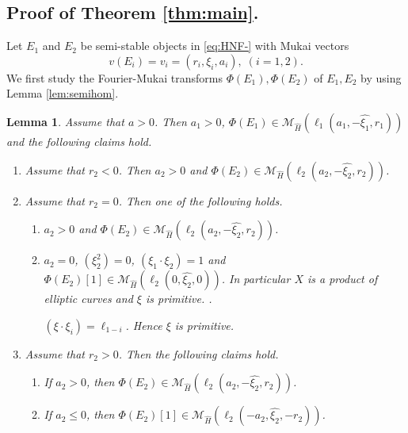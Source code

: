 \documentclass[10pt]{amsart}
\def\cal{\mathcal}
\newenvironment{NB}{
\color{red}{\bf NB}. \footnotesize 
}{}
\numberwithin{equation}{section}
\theoremstyle{plain}
\newtheorem{lem}[thm]{Lemma}
\theoremstyle{definition}
\theoremstyle{remark}
\begin{document}
\subsection{Proof of Theorem \ref{thm:main}.}\label{subsect:proof}

Let $E_1$ and $E_2$ be semi-stable objects in \eqref{eq:HNF-} with Mukai vectors
\begin{equation}
v(E_i)=v_i=(r_i,\xi_i,a_i),\;(i=1,2).
\end{equation}
We first study the Fourier-Mukai transforms $\Phi(E_1),\Phi(E_2)$ of $E_1,E_2$
by using Lemma \ref{lem:semihom}.

\begin{lem}\label{lem:a>0}
Assume that $a >0$.
Then $a_1>0$,
$\Phi(E_1) \in
{\cal M}_{\widehat{H}}(\ell_1(a_1,-\widehat{\xi_1},r_1))$
and the following claims hold.
\begin{enumerate}
\item[(1)]
Assume that $r_2<0$.
Then $a_2>0$ and $\Phi(E_2) \in {\cal M}_{\widehat{H}}(\ell_2(a_2,-\widehat{\xi_2},r_2))$.
\item[(2)]
Assume that $r_2=0$.
Then one of the following holds.
\begin{enumerate}
\item
$a_2>0$ and $\Phi(E_2) \in {\cal M}_{\widehat{H}}(\ell_2(a_2,-\widehat{\xi_2},r_2))$.
\item
$a_2=0$, 
$(\xi_2^2)=0$, $(\xi_1 \cdot \xi_2)=1$
and $\Phi(E_2)[1] \in {\cal M}_{\widehat{H}}(\ell_2(0,\widehat{\xi_2},0))$.
In particular $X$ is a product of elliptic curves and $\xi$ is primitive.
\begin{NB}
$(\xi \cdot \xi_i)=\ell_{1-i}$.
Hence $\xi$ is primitive. 
\end{NB}
\end{enumerate}
\item[(3)]
Assume that $r_2>0$. Then the following claims hold.
\begin{enumerate}
\item
If $a_2 > 0$, then
$\Phi(E_2) \in {\cal M}_{\widehat{H}}(\ell_2(a_2,-\widehat{\xi_2},r_2))$.
\item
If $a_2 \leq 0$, then 
$\Phi(E_2)[1] \in {\cal M}_{\widehat{H}}(\ell_2(-a_2,\widehat{\xi_2},-r_2))$. 
\end{enumerate}
\end{enumerate}
\end{lem}
\end{document}
